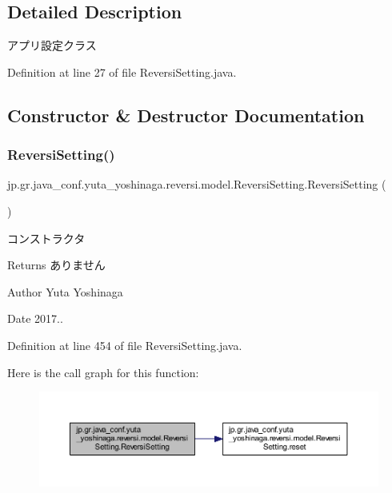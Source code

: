\subsection{Detailed Description}
アプリ設定クラス 

Definition at line 27 of file Reversi\+Setting.\+java.



\subsection{Constructor \& Destructor Documentation}
\mbox{\label{classjp_1_1gr_1_1java__conf_1_1yuta__yoshinaga_1_1reversi_1_1model_1_1_reversi_setting_a0e2fd0216ad010dbbc9112297a6c29c4}} 
\subsubsection{\texorpdfstring{Reversi\+Setting()}{ReversiSetting()}}
{\footnotesize\ttfamily jp.\+gr.\+java\+\_\+conf.\+yuta\+\_\+yoshinaga.\+reversi.\+model.\+Reversi\+Setting.\+Reversi\+Setting (\begin{DoxyParamCaption}{ }\end{DoxyParamCaption})}



コンストラクタ 

\begin{DoxyReturn}{Returns}
ありません 
\end{DoxyReturn}
\begin{DoxyAuthor}{Author}
Yuta Yoshinaga 
\end{DoxyAuthor}
\begin{DoxyDate}{Date}
2017.. 
\end{DoxyDate}


Definition at line 454 of file Reversi\+Setting.\+java.

Here is the call graph for this function\+:
\nopagebreak
\begin{figure}[H]
\begin{center}
\leavevmode
\includegraphics[width=350pt]{classjp_1_1gr_1_1java__conf_1_1yuta__yoshinaga_1_1reversi_1_1model_1_1_reversi_setting_a0e2fd0216ad010dbbc9112297a6c29c4_cgraph}
\end{center}
\end{figure}


